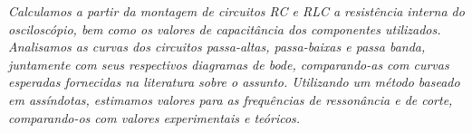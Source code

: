 \textit{Calculamos a partir da montagem de circuitos RC e RLC a resistência interna do osciloscópio, bem como os valores de capacitância dos componentes utilizados. Analisamos as curvas dos circuitos passa-altas, passa-baixas e passa banda, juntamente com seus respectivos diagramas de bode, comparando-as com curvas esperadas fornecidas na literatura sobre o assunto. Utilizando um método baseado em assíndotas, estimamos valores para as frequências de ressonância e de corte, comparando-os com valores experimentais e teóricos.}


